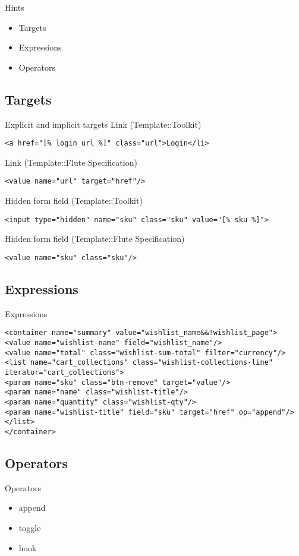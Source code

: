 \begin{frame}{Hints}
\begin{itemize}
\item Targets
\item Expressions
\item Operators
\end{itemize}
\end{frame}

\subsection{Targets}
\begin{frame}[fragile]{Explicit and implicit targets}
Link (Template::Toolkit)
\begin{lstlisting}
<a href="[% login_url %]" class="url">Login</li>
\end{lstlisting}
Link (Template::Flute Specification)
\begin{lstlisting}
<value name="url" target="href"/>
\end{lstlisting}
Hidden form field (Template::Toolkit)
\begin{lstlisting}
<input type="hidden" name="sku" class="sku" value="[% sku %]">
\end{lstlisting}
Hidden form field (Template::Flute Specification)
\begin{lstlisting}
<value name="sku" class="sku"/>
\end{lstlisting}
\end{frame}

\subsection{Expressions}
\begin{frame}[fragile]{Expressions}
\begin{lstlisting}
<container name="summary" value="wishlist_name&&!wishlist_page">
<value name="wishlist-name" field="wishlist_name"/>
<value name="total" class="wishlist-sum-total" filter="currency"/>
<list name="cart_collections" class="wishlist-collections-line" iterator="cart_collections">
<param name="sku" class="btn-remove" target="value"/>
<param name="name" class="wishlist-title"/>
<param name="quantity" class="wishlist-qty"/>
<param name="wishlist-title" field="sku" target="href" op="append"/>
</list>
</container>
\end{lstlisting}
\end{frame}

\subsection{Operators}
\begin{frame}{Operators}
\begin{itemize}
\item append
\item toggle
\item hook
\end{itemize}
\end{frame}

